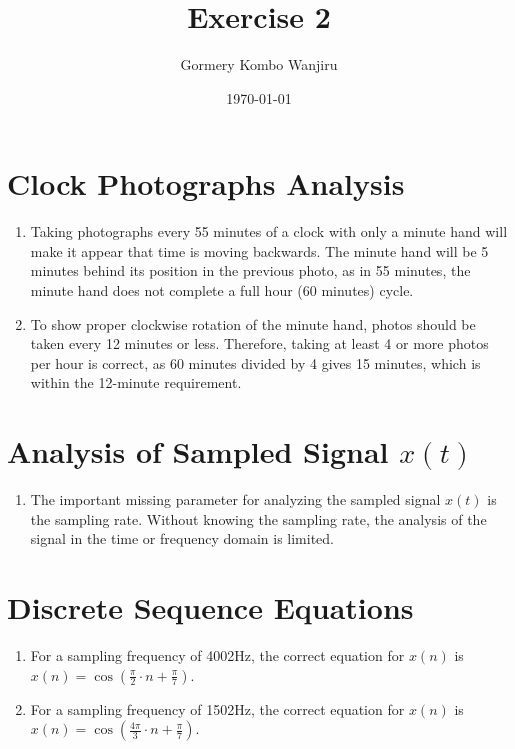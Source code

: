 \documentclass{article}
\begin{document}
\title{Exercise 2}
\author{Gormery Kombo Wanjiru}
\date{\today}
\maketitle

\section*{Clock Photographs Analysis}

\begin{enumerate}
    \item Taking photographs every 55 minutes of a clock with only a minute hand will make it appear that time is moving backwards. The minute hand will be 5 minutes behind its position in the previous photo, as in 55 minutes, the minute hand does not complete a full hour (60 minutes) cycle.
    \item To show proper clockwise rotation of the minute hand, photos should be taken every 12 minutes or less. Therefore, taking at least 4 or more photos per hour is correct, as 60 minutes divided by 4 gives 15 minutes, which is within the 12-minute requirement.
\end{enumerate}

\section*{Analysis of Sampled Signal \( x(t) \)}

\begin{enumerate}
    \item The important missing parameter for analyzing the sampled signal \( x(t) \) is the sampling rate. Without knowing the sampling rate, the analysis of the signal in the time or frequency domain is limited.
\end{enumerate}

\section*{Discrete Sequence Equations}

\begin{enumerate}
    \item For a sampling frequency of 4002Hz, the correct equation for \( x(n) \) is \( x(n) = \cos\left(\frac{\pi}{2} \cdot n + \frac{\pi}{7}\right) \).
    \item For a sampling frequency of 1502Hz, the correct equation for \( x(n) \) is \( x(n) = \cos\left(\frac{4\pi}{3} \cdot n + \frac{\pi}{7}\right) \).
\end{enumerate}
\end{document}
